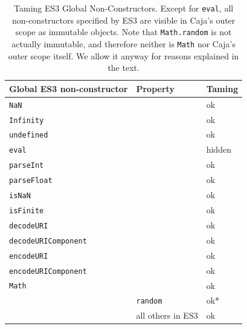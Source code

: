 \documentclass[letterpaper,twocolumn,10pt]{article}
\newcommand{\code}[1]{{\tt {#1}}}              %
\begin{document}
\begin{table}
\begin{tabular}{lll}
  Global ES3 non-constructor & Property                   & Taming \\
  \hline
  \code{NaN}                &                             & ok \\
  \code{Infinity}           &                             & ok \\
  \code{undefined}          &                             & ok \\
  \code{eval}               &                             & hidden \\
  \code{parseInt}           &                             & ok \\
  \code{parseFloat}         &                             & ok \\
  \code{isNaN}              &                             & ok \\
  \code{isFinite}           &                             & ok \\
  \hline
  \code{decodeURI}          &                             & ok \\
  \code{decodeURIComponent} &                             & ok \\
  \code{encodeURI}          &                             & ok \\
  \code{encodeURIComponent} &                             & ok \\
  \hline
  \code{Math}               &                             & ok \\  
                            & \code{random}               & ok* \\
                            &           all others in ES3 & ok \\
\end{tabular}

\caption[Taming ES3 Global Non-Constructors.]{Taming ES3 Global 
Non-Constructors. Except for \code{eval}, all non-constructors specified by 
ES3 are visible in Caja's outer scope as immutable objects. Note that 
\code{Math.random} is not actually immutable, and therefore neither is 
\code{Math} nor Caja's outer scope itself. We allow it anyway for reasons
explained in the text.}
\label{tab:taming-es3}
\end{table}
  
\end{document}
